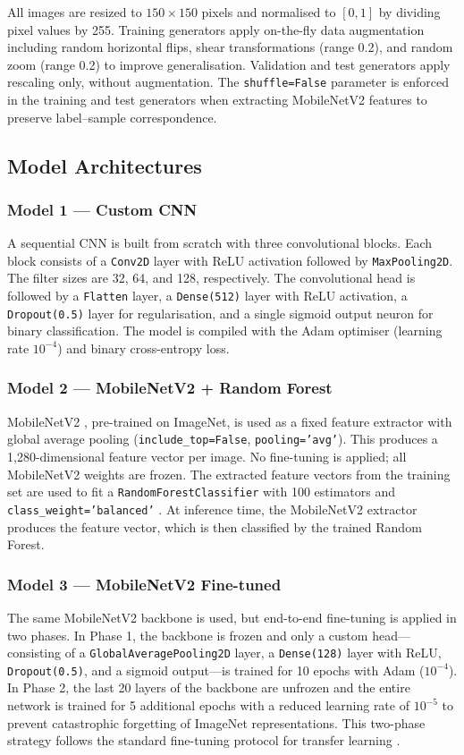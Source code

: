 \documentclass[conference]{IEEEtran}
\begin{document}
All images are resized to $150 \times 150$ pixels and normalised
to $[0,1]$ by dividing pixel values by 255. Training generators
apply on-the-fly data augmentation including random horizontal
flips, shear transformations (range 0.2), and random zoom
(range 0.2) to improve generalisation. Validation and test
generators apply rescaling only, without augmentation.
The \texttt{shuffle=False} parameter is enforced in the training
and test generators when extracting MobileNetV2 features to
preserve label–sample correspondence.

\subsection{Model Architectures}

\subsubsection{Model 1 — Custom CNN}
A sequential CNN is built from scratch with three
convolutional blocks. Each block consists of a
\texttt{Conv2D} layer with ReLU activation followed by
\texttt{MaxPooling2D}. The filter sizes are 32, 64, and 128,
respectively. The convolutional head is followed by a
\texttt{Flatten} layer, a \texttt{Dense(512)} layer with
ReLU activation, a \texttt{Dropout(0.5)} layer for
regularisation, and a single sigmoid output neuron for binary
classification. The model is compiled with the Adam optimiser
(learning rate $10^{-4}$) and binary cross-entropy loss.

\subsubsection{Model 2 — MobileNetV2 + Random Forest}
MobileNetV2 \cite{sandler2018}, pre-trained on ImageNet, is
used as a fixed feature extractor with global average pooling
(\texttt{include\_top=False}, \texttt{pooling='avg'}). This
produces a 1,280-dimensional feature vector per image.
No fine-tuning is applied; all MobileNetV2 weights are
frozen. The extracted feature vectors from the training set
are used to fit a \texttt{RandomForestClassifier} with
100 estimators and \texttt{class\_weight='balanced'}
\cite{breiman2001}. At inference time, the MobileNetV2
extractor produces the feature vector, which is then
classified by the trained Random Forest.

\subsubsection{Model 3 — MobileNetV2 Fine-tuned}
The same MobileNetV2 backbone is used, but end-to-end
fine-tuning is applied in two phases. In Phase 1, the
backbone is frozen and only a custom head—consisting of a
\texttt{GlobalAveragePooling2D} layer, a
\texttt{Dense(128)} layer with ReLU, \texttt{Dropout(0.5)},
and a sigmoid output—is trained for 10 epochs with
Adam ($10^{-4}$). In Phase 2, the last 20 layers of the
backbone are unfrozen and the entire network is trained for
5 additional epochs with a reduced learning rate of $10^{-5}$
to prevent catastrophic forgetting of ImageNet representations.
This two-phase strategy follows the standard fine-tuning
protocol for transfer learning \cite{pan2010}.
\end{document}
